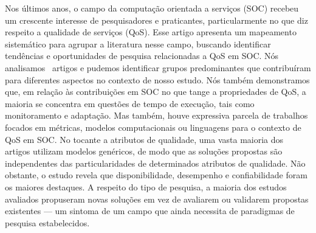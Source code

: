\documentclass[conference]{IEEEtran}
\begin{document}
\begin{resumo}
  Nos \'{u}ltimos anos, o campo da computa\c{c}\~{a}o orientada a serviços (SOC) recebeu um crescente interesse de pesquisadores e praticantes, particularmente no que diz respeito a qualidade de servi\c{c}os (QoS). Esse artigo apresenta um mapeamento sistem\'{a}tico para agrupar a literatura nesse campo, buscando identificar tend\^{e}ncias e oportunidades de pesquisa relacionadas a QoS em SOC. N\'{o}s analisamos \AcceptedPubs~artigos e pudemos identificar grupos predominantes que contribu\'{i}ram para diferentes aspectos no contexto de nosso estudo. N\'{o}s tamb\'{e}m demonstramos que, em rela\c{c}\~{a}o \`{a}s contribui\c{c}\~{o}es em SOC no que tange a propriedades de QoS, a maioria se concentra em quest\~{o}es de tempo de execu\c{c}\~{a}o, tais como monitoramento e adapta\c{c}\~{a}o. Mas tamb\'{e}m, houve expressiva parcela de trabalhos focados em m\'{e}tricas, modelos computacionais ou linguagens para o contexto de QoS em SOC. No tocante a atributos de qualidade, uma vasta maioria dos artigos utilizam 
modelos gen\'{e}ricos, de modo que as solu\c{c}\~{o}es propostas s\~{a}o independentes das particularidades de determinados atributos de qualidade. N\~{a}o obstante, o estudo revela que disponibilidade, desempenho e confiabilidade foram os maiores destaques. A respeito do tipo de pesquisa, a maioria dos estudos avaliados propuseram novas solu\c{c}\~{o}es em vez de avaliarem ou validarem propostas existentes --- um sintoma de um campo que ainda necessita de paradigmas de pesquisa estabelecidos.
\end{resumo}



%
\IEEEpeerreviewmaketitle
\end{document}
